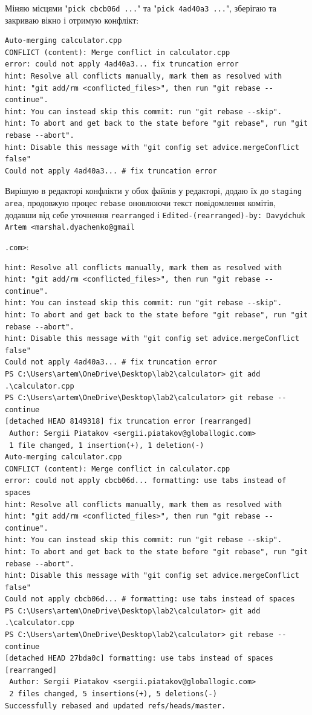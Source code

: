 \documentclass[a4paper,12pt]{article}
\begin{document}
    Міняю місцями "\texttt{pick cbcb06d ...}" та "\texttt{pick 4ad40a3 ...}", зберігаю та закриваю вікно і отримую конфлікт:

    \begin{verbatim}
Auto-merging calculator.cpp
CONFLICT (content): Merge conflict in calculator.cpp
error: could not apply 4ad40a3... fix truncation error
hint: Resolve all conflicts manually, mark them as resolved with
hint: "git add/rm <conflicted_files>", then run "git rebase --continue".
hint: You can instead skip this commit: run "git rebase --skip".
hint: To abort and get back to the state before "git rebase", run "git rebase --abort".
hint: Disable this message with "git config set advice.mergeConflict false"
Could not apply 4ad40a3... # fix truncation error
    \end{verbatim}

    Вирішую в редакторі конфлікти у обох файлів у редакторі, додаю їх до \texttt{staging area}, продовжую процес \texttt{rebase} оновлюючи текст повідомлення
    комітів, додавши від себе уточнення \texttt{rearranged} і \texttt{Edited-(rearranged)-by: Davydchuk Artem <marshal.dyachenko@gmail}

    \texttt{.com>}:
    \begin{verbatim}
hint: Resolve all conflicts manually, mark them as resolved with
hint: "git add/rm <conflicted_files>", then run "git rebase --continue".
hint: You can instead skip this commit: run "git rebase --skip".
hint: To abort and get back to the state before "git rebase", run "git rebase --abort".
hint: Disable this message with "git config set advice.mergeConflict false"
Could not apply 4ad40a3... # fix truncation error
PS C:\Users\artem\OneDrive\Desktop\lab2\calculator> git add .\calculator.cpp
PS C:\Users\artem\OneDrive\Desktop\lab2\calculator> git rebase --continue 
[detached HEAD 8149318] fix truncation error [rearranged]
 Author: Sergii Piatakov <sergii.piatakov@globallogic.com>
 1 file changed, 1 insertion(+), 1 deletion(-)
Auto-merging calculator.cpp
CONFLICT (content): Merge conflict in calculator.cpp
error: could not apply cbcb06d... formatting: use tabs instead of spaces
hint: Resolve all conflicts manually, mark them as resolved with
hint: "git add/rm <conflicted_files>", then run "git rebase --continue".
hint: You can instead skip this commit: run "git rebase --skip".
hint: To abort and get back to the state before "git rebase", run "git rebase --abort".
hint: Disable this message with "git config set advice.mergeConflict false"
Could not apply cbcb06d... # formatting: use tabs instead of spaces
PS C:\Users\artem\OneDrive\Desktop\lab2\calculator> git add .\calculator.cpp
PS C:\Users\artem\OneDrive\Desktop\lab2\calculator> git rebase --continue 
[detached HEAD 27bda0c] formatting: use tabs instead of spaces [rearranged]
 Author: Sergii Piatakov <sergii.piatakov@globallogic.com>
 2 files changed, 5 insertions(+), 5 deletions(-)
Successfully rebased and updated refs/heads/master.
    \end{verbatim}
\end{document}
